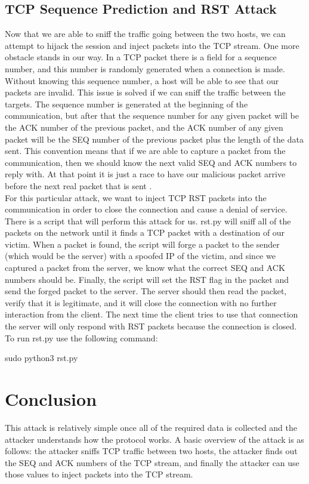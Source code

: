\documentclass{article}
\begin{document}
\subsection{TCP Sequence Prediction and RST Attack}
Now that we are able to sniff the traffic going between the two hosts, we can
attempt to hijack the session and inject packets into the TCP stream. One more
obstacle stands in our way. In a TCP packet there is a field for a sequence
number, and this number is randomly generated when a connection is made.
Without knowing this sequence number, a host will be able to see that our
packets are invalid. This issue is solved if we can sniff the traffic between
the targets. The sequence number is generated at the beginning of the
communication, but after that the sequence number for any given packet will
be the ACK number of the previous packet, and the ACK number of any given
packet will be the SEQ number of the previous packet plus the length of the 
data sent. This convention means that if we are able to capture a packet from
the communication, then we should know the next valid SEQ and ACK numbers to
reply with. At that point it is just a race to have our malicious packet
arrive before the next real packet that is sent \cite{SEQ}.\\
For this particular attack, we want to inject TCP RST packets into the
communication in order to close the connection and cause a denial of service.
There is a script that will perform this attack for us. rst.py will sniff all
of the packets on the network until it finds a TCP packet with a destination of 
our victim. When a packet is found, the script will forge a packet to the sender 
(which would be the server) with a spoofed IP of the victim, and since we captured 
a packet from the server, we know what the correct SEQ and ACK numbers should be. 
Finally, the script will set the RST flag in the packet and send the forged packet 
to the server. The server should then read the packet, verify that it is legitimate, 
and it will close the connection with no further interaction from the client. 
The next time the client tries to use that connection the server will only 
respond with RST packets because the connection is closed. To run rst.py use
the following command:\\
\begin{verb}
sudo python3 rst.py
\end{verb}

\section{Conclusion}
This attack is relatively simple once all of the required data is collected and
the attacker understands how the protocol works. A basic overview of the attack
is as follows: the attacker sniffs TCP traffic between two hosts, the attacker
finds out the SEQ and ACK numbers of the TCP stream, and finally the attacker
can use those values to inject packets into the TCP stream.
\end{document}
